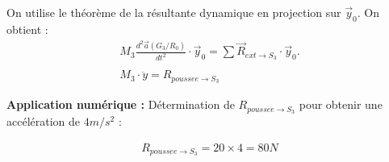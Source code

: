 \documentclass[10pt,fleqn]{article} %
\begin{document}
\begin{multicols}{2}
\begin{exemple}
On utilise le théorème de la résultante dynamique en projection sur $\overrightarrow{y}_0$. On obtient : 
\begin{align*}
M_3\frac{d^2\overrightarrow{a}(G_3/R_0)}{dt^2}\cdot \overrightarrow{y}_0=\sum \overrightarrow{R}_{ext\to S_3}\cdot \overrightarrow{y}_0.\\
\\
M_3\cdot \ddot{y}=R_{poussee\to S_3}
\end{align*} 

\textbf{Application numérique : }
Détermination de $R_{poussee\to S_3}$ pour obtenir une accélération de $4m/s^2$ :

\begin{align*}
R_{poussee\to S_3}=20\times 4=80N
\end{align*}
\end{exemple}





\end{multicols}
\end{document}
